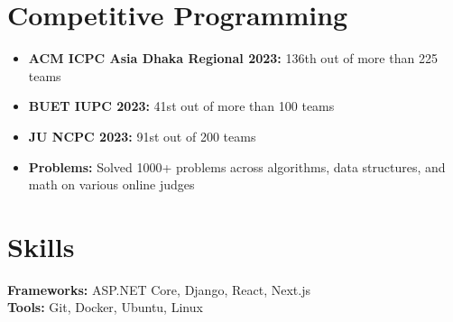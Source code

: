 \documentclass[11pt]{article}       %
\begin{document}
\vspace{-18.5pt}

\section*{Competitive Programming}
\begin{itemize}
    \item \textbf{ACM ICPC Asia Dhaka Regional 2023:} 136th out of more than 225 teams
    \item \textbf{BUET IUPC 2023:} 41st out of more than 100 teams
    \item \textbf{JU NCPC 2023:} 91st out of 200 teams
    \item \textbf{Problems:} Solved 1000+ problems across algorithms, data structures, and math on various online judges
\end{itemize}

\vspace{-18.5pt}

\section*{Skills}
\textbf{Frameworks:} ASP.NET Core, Django, React, Next.js \\
\textbf{Tools:} Git, Docker, Ubuntu, Linux
\end{document}
